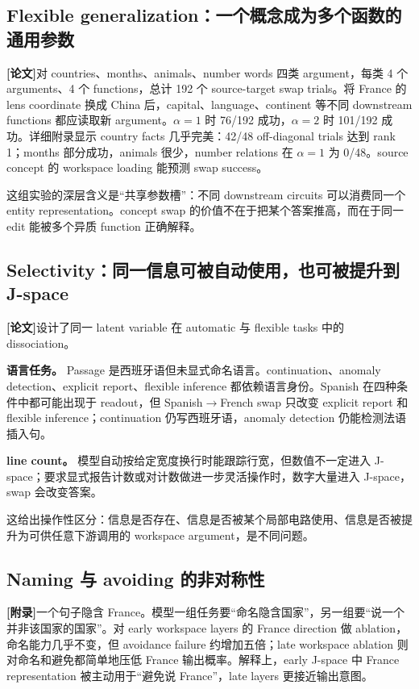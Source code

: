 \documentclass[10.5pt,a4paper]{ctexart}
\newcommand{\Paper}{\textbf{[论文]}}
\newcommand{\AppendixTag}{\textbf{[附录]}}
\begin{document}
\subsection{Flexible generalization：一个概念成为多个函数的通用参数}
\Paper 对 countries、months、animals、number words 四类 argument，每类 4 个 arguments、4 个 functions，总计 192 个 source-target swap trials。将 France 的 lens coordinate 换成 China 后，capital、language、continent 等不同 downstream functions 都应读取新 argument。$\alpha=1$ 时 76/192 成功，$\alpha=2$ 时 101/192 成功。详细附录显示 country facts 几乎完美：42/48 off-diagonal trials 达到 rank 1；months 部分成功，animals 很少，number relations 在 $\alpha=1$ 为 0/48。source concept 的 workspace loading 能预测 swap success。

\begin{inferclaim}
这组实验的深层含义是“共享参数槽”：不同 downstream circuits 可以消费同一个 entity representation。concept swap 的价值不在于把某个答案推高，而在于同一 edit 能被多个异质 function 正确解释。
\end{inferclaim}

\subsection{Selectivity：同一信息可被自动使用，也可被提升到 J-space}
\Paper 设计了同一 latent variable 在 automatic 与 flexible tasks 中的 dissociation。

\textbf{语言任务。} Passage 是西班牙语但未显式命名语言。continuation、anomaly detection、explicit report、flexible inference 都依赖语言身份。Spanish 在四种条件中都可能出现于 readout，但 Spanish$\to$French swap 只改变 explicit report 和 flexible inference；continuation 仍写西班牙语，anomaly detection 仍能检测法语插入句。

\textbf{line count。} 模型自动按给定宽度换行时能跟踪行宽，但数值不一定进入 J-space；要求显式报告计数或对计数做进一步灵活操作时，数字大量进入 J-space，swap 会改变答案。

这给出操作性区分：信息是否存在、信息是否被某个局部电路使用、信息是否被提升为可供任意下游调用的 workspace argument，是不同问题。

\subsection{Naming 与 avoiding 的非对称性}
\AppendixTag 一个句子隐含 France。模型一组任务要“命名隐含国家”，另一组要“说一个并非该国家的国家”。对 early workspace layers 的 France direction 做 ablation，命名能力几乎不变，但 avoidance failure 约增加五倍；late workspace ablation 则对命名和避免都简单地压低 France 输出概率。解释上，early J-space 中 France representation 被主动用于“避免说 France”，late layers 更接近输出意图。
\end{document}
